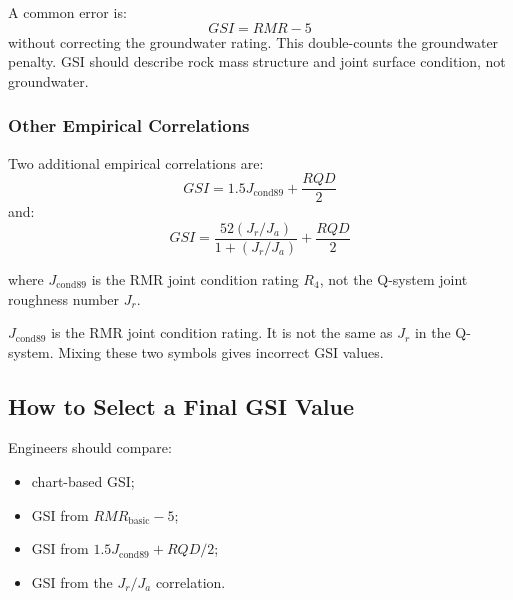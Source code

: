 \begin{warnbox}
A common error is:
\[
GSI = RMR - 5
\]
without correcting the groundwater rating. This double-counts the groundwater penalty.
GSI should describe rock mass structure and joint surface condition, not groundwater.
\end{warnbox}

\subsubsection{Other Empirical Correlations}

Two additional empirical correlations are:
\[
GSI = 1.5J_{\text{cond89}} + \frac{RQD}{2}
\]
and:
\[
GSI =
\frac{52(J_r/J_a)}
{1+(J_r/J_a)}
+
\frac{RQD}{2}
\]

where \(J_{\text{cond89}}\) is the RMR joint condition rating \(R_4\), not the Q-system
joint roughness number \(J_r\).

\begin{warnbox}
\(J_{\text{cond89}}\) is the RMR joint condition rating. It is not the same as \(J_r\) in
the Q-system. Mixing these two symbols gives incorrect GSI values.
\end{warnbox}

\subsection{How to Select a Final GSI Value}

Engineers should compare:
\begin{itemize}
 \item chart-based GSI;
 \item GSI from \(RMR_{\text{basic}}-5\);
 \item GSI from \(1.5J_{\text{cond89}}+RQD/2\);
 \item GSI from the \(J_r/J_a\) correlation.
\end{itemize}

